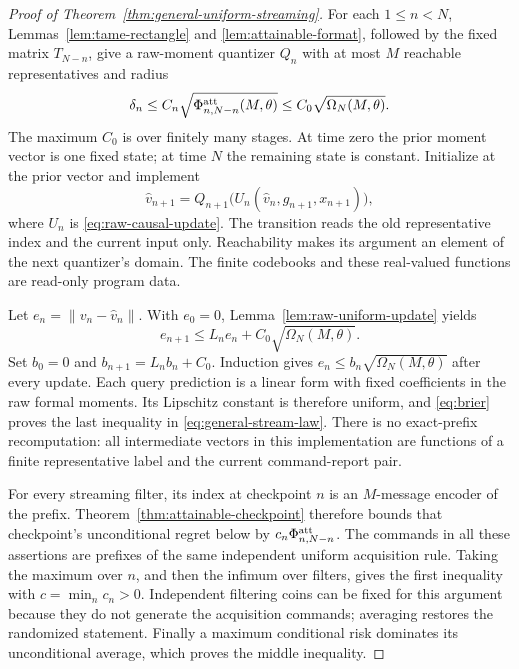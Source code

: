 \begin{proof}[Proof of Theorem~\ref{thm:general-uniform-streaming}]
For each $1\le n<N$, Lemmas~\ref{lem:tame-rectangle} and
\ref{lem:attainable-format}, followed by the fixed matrix $T_{N-n}$,
give a raw-moment quantizer $Q_n$ with at most $M$ reachable
representatives and radius
\[
 \delta_n\le C_n\sqrt{\Phi^{\rm att}_{n,N-n}(M,\theta)}
             \le C_0\sqrt{\Omega_N(M,\theta)}.
\]
The maximum $C_0$ is over finitely many stages. At time zero the prior
moment vector is one fixed state; at time $N$ the remaining state is
constant. Initialize at the prior vector and implement
\[
 \widehat v_{n+1}=Q_{n+1}
       \bigl(U_n(\widehat v_n,g_{n+1},x_{n+1})\bigr),
\]
where $U_n$ is \eqref{eq:raw-causal-update}. The transition reads the
old representative index and the current input only. Reachability makes
its argument an element of the next quantizer's domain. The finite
codebooks and these real-valued functions are read-only program data.

Let $e_n=\|v_n-\widehat v_n\|$. With $e_0=0$,
Lemma~\ref{lem:raw-uniform-update} yields
\[
 e_{n+1}\le L_ne_n+C_0\sqrt{\Omega_N(M,\theta)}.
\]
Set $b_0=0$ and $b_{n+1}=L_nb_n+C_0$. Induction gives
$e_n\le b_n\sqrt{\Omega_N(M,\theta)}$ after every update.
Each query prediction is a linear form with fixed coefficients in the
raw formal moments. Its Lipschitz constant is therefore uniform, and
\eqref{eq:brier} proves the last inequality in
\eqref{eq:general-stream-law}. There is no exact-prefix recomputation:
all intermediate vectors in this implementation are functions of a finite
representative label and the current command-report pair.

For every streaming filter, its index at checkpoint $n$ is an
$M$-message encoder of the prefix. Theorem~\ref{thm:attainable-checkpoint}
therefore bounds that checkpoint's unconditional regret below by
$c_n\Phi^{\rm att}_{n,N-n}$. The commands in all these assertions
are prefixes of the same independent uniform acquisition rule. Taking
the maximum over $n$, and then the infimum over filters, gives the
first inequality with $c=\min_n c_n>0$. Independent filtering coins
can be fixed for this argument because they do not generate the
acquisition commands; averaging restores the randomized statement.
Finally a maximum conditional risk dominates its unconditional average,
which proves the middle inequality.
\end{proof}


